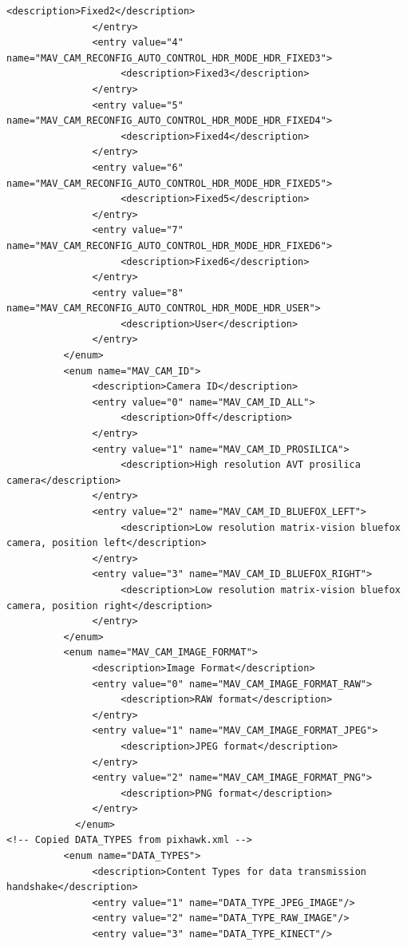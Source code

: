 \begin{lstlisting}[captionpos=b, caption="Definition of \textsc{Skye} specific Mavlink messages", label=app_xml]
                    <description>Fixed2</description>
               </entry>
               <entry value="4" name="MAV_CAM_RECONFIG_AUTO_CONTROL_HDR_MODE_HDR_FIXED3">
                    <description>Fixed3</description>
               </entry>
               <entry value="5" name="MAV_CAM_RECONFIG_AUTO_CONTROL_HDR_MODE_HDR_FIXED4">
                    <description>Fixed4</description>
               </entry>
               <entry value="6" name="MAV_CAM_RECONFIG_AUTO_CONTROL_HDR_MODE_HDR_FIXED5">
                    <description>Fixed5</description>
               </entry>
               <entry value="7" name="MAV_CAM_RECONFIG_AUTO_CONTROL_HDR_MODE_HDR_FIXED6">
                    <description>Fixed6</description>
               </entry>
               <entry value="8" name="MAV_CAM_RECONFIG_AUTO_CONTROL_HDR_MODE_HDR_USER">
                    <description>User</description>
               </entry>
          </enum>
          <enum name="MAV_CAM_ID">
               <description>Camera ID</description>
               <entry value="0" name="MAV_CAM_ID_ALL">
                    <description>Off</description>
               </entry>
               <entry value="1" name="MAV_CAM_ID_PROSILICA">
                    <description>High resolution AVT prosilica camera</description>
               </entry>
               <entry value="2" name="MAV_CAM_ID_BLUEFOX_LEFT">
                    <description>Low resolution matrix-vision bluefox camera, position left</description>
               </entry>
               <entry value="3" name="MAV_CAM_ID_BLUEFOX_RIGHT">
                    <description>Low resolution matrix-vision bluefox camera, position right</description>
               </entry>
          </enum>
          <enum name="MAV_CAM_IMAGE_FORMAT">
               <description>Image Format</description>
               <entry value="0" name="MAV_CAM_IMAGE_FORMAT_RAW">
                    <description>RAW format</description>
               </entry>
               <entry value="1" name="MAV_CAM_IMAGE_FORMAT_JPEG">
                    <description>JPEG format</description>
               </entry>
               <entry value="2" name="MAV_CAM_IMAGE_FORMAT_PNG">
                    <description>PNG format</description>
               </entry>
	        </enum>
<!-- Copied DATA_TYPES from pixhawk.xml -->
          <enum name="DATA_TYPES">
               <description>Content Types for data transmission handshake</description>
               <entry value="1" name="DATA_TYPE_JPEG_IMAGE"/>
               <entry value="2" name="DATA_TYPE_RAW_IMAGE"/>
               <entry value="3" name="DATA_TYPE_KINECT"/>

\end{lstlisting}
